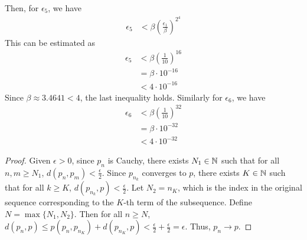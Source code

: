 \documentclass[11pt]{article}
\begin{document}
\begin{exercise}{16}
\begin{solution}
\begin{enumerate} [(a)]
\begin{solution}
            Then, for $\epsilon_5$, we have 
            \begin{equation*}
                \begin{split}
                    \epsilon_5 & < \beta \left( \frac{\epsilon_1}{\beta} \right)^{2^4}
                \end{split}
            \end{equation*}
            This can be estimated as 
            \begin{equation*}
                \begin{split}
                    \epsilon_5 & < \beta \left( \frac{1}{10} \right) ^ {16} \\
                    & = \beta \cdot 10^{-16} \\
                    & < 4 \cdot 10^{-16}
                \end{split}
            \end{equation*}
            Since $\beta \approx 3.4641 < 4$, the last inequality holds. Similarly for $\epsilon_6$, we have \begin{equation*}
                \begin{split}
                    \epsilon_6 & < \beta \left( \frac{1}{10} \right) ^{32} \\
                    & = \beta \cdot 10^{-32} \\
                    & < 4 \cdot 10^{-32}
                \end{split}
            \end{equation*}
        \end{solution}
    \end{enumerate}
    \end{solution}
\end{exercise}

\begin{exercise}{20}
    \begin{proof}
        Given $\epsilon > 0$, since $p_n$ is Cauchy, there exists $N_1 \in \mathbb{N}$ such that for all $n, m \ge N_1$, $d(p_n, p_m) < \frac{\epsilon}{2}$. Since $p_{n_k}$ converges to $p$, there exists $K \in \mathbb{N}$ such that for all $k \ge K$, $d(p_{n_k}, p) < \frac{\epsilon}{2}$. Let $N_2 = n_K$, which is the index in the original sequence corresponding to the $K$-th term of the subsequence. Define $N = \max \{ N_1, N_2 \}$. Then for all $n \ge N$, $d(p_n, p) \le p(p_n, p_{n_K}) + d(p_{n_K}, p) < \frac{\epsilon}{2} + \frac{\epsilon}{2} = \epsilon$. Thus, $p_n \to p$.  
    \end{proof}
\end{exercise}
\end{document}
